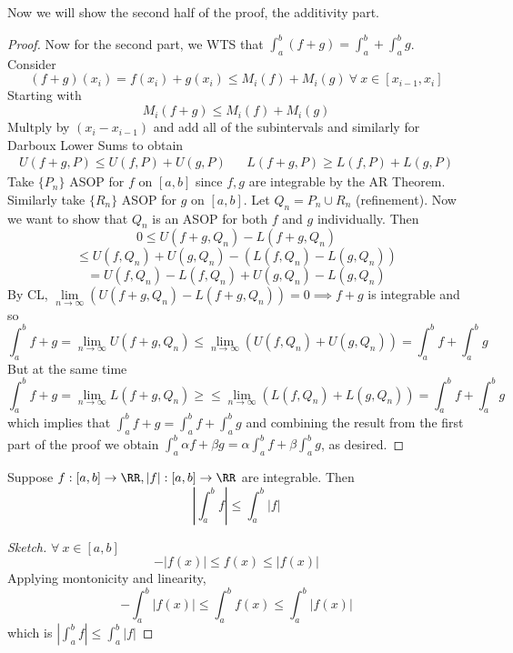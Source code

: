 \documentclass[12pt]{scrartcl}
\begin{document}
\begin{theorem}

Now we will show the second half of the proof, the additivity part.

\begin{proof}

\hfill

Now for the second part, we WTS that $\int_a^b(f + g) = \int_a^b + \int_a^b g$. Consider 
\[(f+g)(x_i) = f(x_i) + g(x_i) \leq M_i(f) + M_i(g) \ \forall \ x \in [x_{i-1}, x_i]\]
Starting with 
\[M_i(f + g) \leq M_i(f) + M_i(g)\]
Multply by $(x_i - x_{i-1})$ and add all of the subintervals and similarly for Darboux Lower Sums to obtain 
\begin{align*}
U(f + g, P) \leq U(f, P) + U(g, P) && L(f + g, P) \geq L(f, P) + L(g, P)
\end{align*}
Take $\{P_n\}$ ASOP for $f$ on $[a,b]$ since $f, g$ are integrable by the AR Theorem. 
Similarly take $\{R_n\}$ ASOP for $g$ on $[a,b]$. Let $Q_n = P_n \cup R_n$ (refinement).
Now we want to show that $Q_n$ is an ASOP for both $f$ and $g$ individually. Then 
\[ 0\leq U(f + g, Q_n) - L(f + g, Q_n)\]
\[\leq U(f, Q_n) + U(g, Q_n) - \left( L(f, Q_n) - L(g, Q_n)\right)\]
\[= U(f, Q_n) - L(f, Q_n) + U(g, Q_n) - L(g, Q_n)\]
By CL, $\underset{n\to\infty}{\lim}\left(U(f + g, Q_n) - L(f + g, Q_n)\right) = 0 \implies f + g$
is integrable and so 
\[\int_a^b f + g = \underset{n\to\infty}{\lim}U(f + g, Q_n) \leq \lim_{n\to\infty} (U(f, Q_n) + U(g, Q_n)) = \int_a^b f + \int_a^b g\]
But at the same time 
\[\int_a^b f + g = \lim_{n\to\infty} L(f + g, Q_n) \geq \leq \lim_{n\to\infty} (L(f, Q_n) + L(g, Q_n)) = \int_a^b f + \int_a^b g\]
which implies that $\int_a^b f + g = \int_a^b f + \int_a^b g$ and combining the result from the first part of the proof 
we obtain $\int_a^b \alpha f + \beta g = \alpha \int_a^b f + \beta \int_a^b g$, as desired. 
\end{proof}
\end{theorem}

\begin{corollary}
  Suppose $f: [a,b] \to \RR, |f|: [a,b] \to \RR$ are integrable.
  Then
  \[|\int_a^b f| \leq \int_a^b |f|\]
  \begin{proof}[Sketch]
    $\forall \ x \in [a,b]$
    \[- |f(x)| \leq f(x) \leq |f(x)|\]
    Applying montonicity and linearity, 
    \[-\int_a^b |f(x)| \leq \int_a^b f(x) \leq \int_a^b |f(x)|\]
    which is $|\int_a^b f| \leq \int_a^b |f|$
  \end{proof}
\end{corollary}
\end{document}
